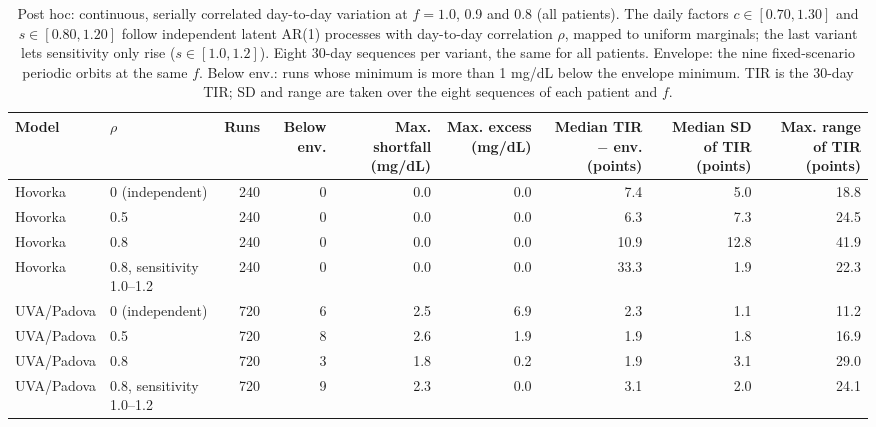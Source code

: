 \begin{table}[H]
\centering
\caption{Post hoc: continuous, serially correlated day-to-day variation at $f=1.0$, 0.9 and 0.8 (all patients). The daily factors $c\in[0.70,1.30]$ and $s\in[0.80,1.20]$ follow independent latent AR(1) processes with day-to-day correlation $\rho$, mapped to uniform marginals; the last variant lets sensitivity only rise ($s\in[1.0,1.2]$). Eight 30-day sequences per variant, the same for all patients. Envelope: the nine fixed-scenario periodic orbits at the same $f$. Below env.: runs whose minimum is more than 1 mg/dL below the envelope minimum. TIR is the 30-day TIR; SD and range are taken over the eight sequences of each patient and $f$.}\label{tab:S9a}
\scriptsize
\begin{tabular}{llrrrrrrr}
\toprule
Model & $\rho$ & Runs & Below env. & Max. shortfall (mg/dL) & Max. excess (mg/dL) & Median TIR $-$ env. (points) & Median SD of TIR (points) & Max. range of TIR (points) \\
\midrule
Hovorka & 0 (independent) & 240 & 0 & 0.0 & 0.0 & 7.4 & 5.0 & 18.8 \\
Hovorka & 0.5 & 240 & 0 & 0.0 & 0.0 & 6.3 & 7.3 & 24.5 \\
Hovorka & 0.8 & 240 & 0 & 0.0 & 0.0 & 10.9 & 12.8 & 41.9 \\
Hovorka & 0.8, sensitivity 1.0--1.2 & 240 & 0 & 0.0 & 0.0 & 33.3 & 1.9 & 22.3 \\
UVA/Padova & 0 (independent) & 720 & 6 & 2.5 & 6.9 & 2.3 & 1.1 & 11.2 \\
UVA/Padova & 0.5 & 720 & 8 & 2.6 & 1.9 & 1.9 & 1.8 & 16.9 \\
UVA/Padova & 0.8 & 720 & 3 & 1.8 & 0.2 & 1.9 & 3.1 & 29.0 \\
UVA/Padova & 0.8, sensitivity 1.0--1.2 & 720 & 9 & 2.3 & 0.0 & 3.1 & 2.0 & 24.1 \\
\bottomrule
\end{tabular}
\end{table}

